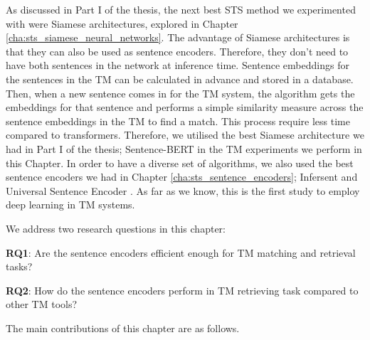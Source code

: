 As discussed in Part I of the thesis, the next best STS method we experimented with were Siamese architectures, explored in Chapter \ref{cha:sts_siamese_neural_networks}. The advantage of Siamese architectures is that they can also be used as sentence encoders. Therefore, they don't need to have both sentences in the network at inference time. Sentence embeddings for the sentences in the TM can be calculated in advance and stored in a database. Then, when a new sentence comes in for the TM system, the algorithm gets the embeddings for that sentence and performs a simple similarity measure across the sentence embeddings in the TM to find a match. This process require less time compared to transformers. Therefore, we utilised the best Siamese architecture we had in Part I of the thesis; Sentence-BERT \autocite{reimers-gurevych-2019-sentence} in the TM experiments we perform in this Chapter. In order to have a diverse set of algorithms, we also used the best sentence encoders we had in Chapter \ref{cha:sts_sentence_encoders}; Infersent \autocite{conneau-EtAl:2017:EMNLP2017} and Universal Sentence Encoder \autocite{cer2018universal}. As far as we know, this is the first study to employ deep learning in TM systems. 

We address two research questions in this chapter:

\textbf{RQ1}: Are the sentence encoders efficient enough for TM matching and retrieval tasks?

\textbf{RQ2}: How do the sentence encoders perform in TM retrieving task compared to other TM tools?

The main contributions of this chapter are as follows.

